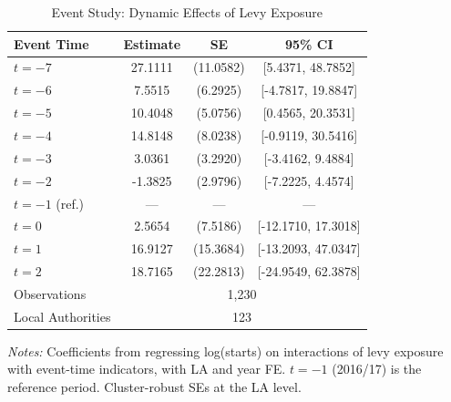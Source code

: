 \begin{table}[htbp]
\centering
\caption{Event Study: Dynamic Effects of Levy Exposure}
\label{tab:eventstudy}
\begin{tabular}{lccc}
\hline\hline
Event Time & Estimate & SE & 95\% CI \\
\hline
$t = -7$ & 27.1111 & (11.0582) & [5.4371, 48.7852] \\
$t = -6$ & 7.5515 & (6.2925) & [-4.7817, 19.8847] \\
$t = -5$ & 10.4048 & (5.0756) & [0.4565, 20.3531] \\
$t = -4$ & 14.8148 & (8.0238) & [-0.9119, 30.5416] \\
$t = -3$ & 3.0361 & (3.2920) & [-3.4162, 9.4884] \\
$t = -2$ & -1.3825 & (2.9796) & [-7.2225, 4.4574] \\
$t = -1$ (ref.) & --- & --- & --- \\
$t = 0$ & 2.5654 & (7.5186) & [-12.1710, 17.3018] \\
$t = 1$ & 16.9127 & (15.3684) & [-13.2093, 47.0347] \\
$t = 2$ & 18.7165 & (22.2813) & [-24.9549, 62.3878] \\
\hline
Observations & \multicolumn{3}{c}{1,230} \\
Local Authorities & \multicolumn{3}{c}{123} \\
\hline\hline
\end{tabular}
\begin{tablenotes}\small
\item \textit{Notes:} Coefficients from regressing log(starts) on interactions of levy exposure with event-time indicators, with LA and year FE. $t = -1$ (2016/17) is the reference period. Cluster-robust SEs at the LA level.
\end{tablenotes}
\end{table}

